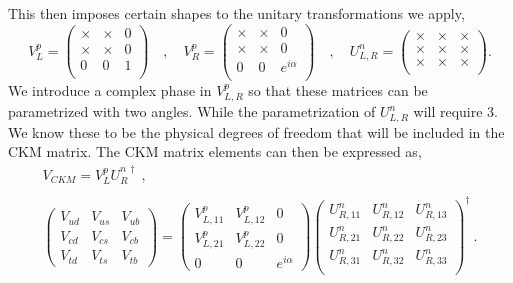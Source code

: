 This then imposes certain shapes to the unitary transformations we apply,
\begin{equation}
V^{p}_{L} = \begin{pmatrix}
\times & \times & 0 \\ 
\times & \times & 0 \\
0 & 0 & 1 \\ 
\end{pmatrix} \quad , \quad   V^{p}_{R} = \begin{pmatrix}
\times & \times & 0 \\ 
\times & \times & 0 \\
0 & 0 & e^{i\alpha}  \\ 
\end{pmatrix}  \quad , \quad 
U^{n}_{L,R} = 
\begin{pmatrix}
\times & \times & \times \\ 
\times & \times & \times \\
\times & \times & \times \\
\end{pmatrix} .
\end{equation}
We introduce a complex phase in $V^p_{L,R}$ so that these matrices can be parametrized with two angles. While the parametrization of $U^n_{L,R}$ will require 3. We know these to be the physical degrees of freedom that will be included in the CKM matrix. The CKM matrix elements can then be expressed as, 
\begin{equation}
\begin{gathered}
V_{CKM} = V_L^p U_R^{n\, \dagger}  \ , \\ 
\\
\begin{pmatrix}
V_{ud} & V_{us} & V_{ub} \\
V_{cd} & V_{cs} & V_{cb} \\ 
V_{td} & V_{ts} & V_{tb} 
\end{pmatrix}  = \begin{pmatrix}
V_{L,11}^p & V_{L,12}^p & 0 \\ 
V_{L,21}^p & V_{L,22}^p & 0 \\ 
0 & 0 & e^{i \alpha} 
\end{pmatrix} \begin{pmatrix}
U_{R,11}^n & U_{R,12}^n & U_{R,13}^n \\
U_{R,21}^n & U_{R,22}^n & U_{R,23}^n \\
U_{R,31}^n & U_{R,32}^n & U_{R,33}^n \\
\end{pmatrix} ^\dagger \ .
\end{gathered} 
\end{equation}
